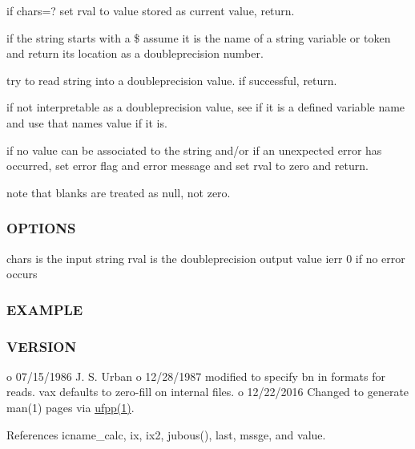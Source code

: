 \begin{DoxyEnumerate}
\item if chars=? set rval to value stored as current value, return.
\item if the string starts with a \$ assume it is the name of a string variable or token and return its location as a doubleprecision number.
\item try to read string into a doubleprecision value. if successful, return.
\item if not interpretable as a doubleprecision value, see if it is a defined variable name and use that name\textquotesingle{}s value if it is.
\item if no value can be associated to the string and/or if an unexpected error has occurred, set error flag and error message and set rval to zero and return.
\item note that blanks are treated as null, not zero. \subsubsection*{O\+P\+T\+I\+O\+NS}
\end{DoxyEnumerate}

chars is the input string rval is the doubleprecision output value ierr 0 if no error occurs

\subsubsection*{E\+X\+A\+M\+P\+LE}

\subsubsection*{V\+E\+R\+S\+I\+ON}

o 07/15/1986 J. S. Urban o 12/28/1987 modified to specify bn in formats for reads. vax defaults to zero-\/fill on internal files. o 12/22/2016 Changed to generate man(1) pages via \hyperlink{ufpp__overview_81_8txt_a97c20a96bcab81bc74c9d64b001f1202}{ufpp(1)}. 

References icname\+\_\+calc, ix, ix2, jubous(), last, mssge, and value.

